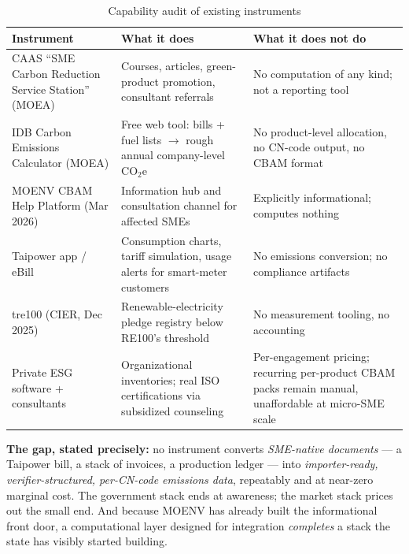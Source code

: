 \begin{table}[htbp]
\caption{Capability audit of existing instruments}
\label{tab:gap}
\small
\begin{tabularx}{\textwidth}{@{}p{}p{}X@{}}
\toprule
\textbf{Instrument} & \textbf{What it does} & \textbf{What it does not do} \\
\midrule
CAAS ``SME Carbon Reduction Service Station'' (MOEA)\cite{caas} & Courses, articles, green-product promotion, consultant referrals & No computation of any kind; not a reporting tool \\
IDB Carbon Emissions Calculator (MOEA)\cite{idb} & Free web tool: bills + fuel lists $\to$ rough annual company-level CO$_2$e & No product-level allocation, no CN-code output, no CBAM format \\
MOENV CBAM Help Platform (Mar 2026)\cite{tpt-cbam} & Information hub and consultation channel for affected SMEs & Explicitly informational; computes nothing \\
Taipower app / eBill\cite{taipower} & Consumption charts, tariff simulation, usage alerts for smart-meter customers & No emissions conversion; no compliance artifacts \\
tre100 (CIER, Dec 2025)\cite{tre100} & Renewable-electricity pledge registry below RE100's threshold & No measurement tooling, no accounting \\
Private ESG software + consultants\cite{chanchin} & Organizational inventories; real ISO certifications via subsidized counseling & Per-engagement pricing; recurring per-product CBAM packs remain manual, unaffordable at micro-SME scale \\
\bottomrule
\end{tabularx}
\end{table}

\textbf{The gap, stated precisely:} no instrument converts \emph{SME-native
documents} --- a Taipower bill, a stack of invoices, a production ledger ---
into \emph{importer-ready, verifier-structured, per-CN-code emissions data},
repeatably and at near-zero marginal cost. The government stack ends at
awareness; the market stack prices out the small end. And because MOENV has
already built the informational front door\cite{tpt-cbam}, a computational
layer designed for integration \emph{completes} a stack the state has visibly
started building.
